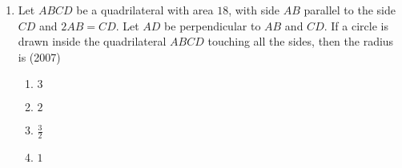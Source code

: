 \begin{enumerate}[label=\thesubsection.\arabic*,ref=\thesubsection.\theenumi]
\begin{multicols}{4}
    \end{multicols}
%
\item Let $ABCD$ be a quadrilateral with area $18$, with side $AB$ parallel to the side $CD$ and $2AB = CD$. Let $AD$ be perpendicular to $AB$ and $CD$. If a circle is drawn inside the quadrilateral $ABCD$ touching all the sides, then the radius is
\hfill (2007)
		\begin{multicols}{4}
\begin{enumerate}
\item $3$
\item $2$
\item $\frac{3}{2}$
\item $1$
\end{enumerate}
\end{multicols}
%
\end{enumerate}
